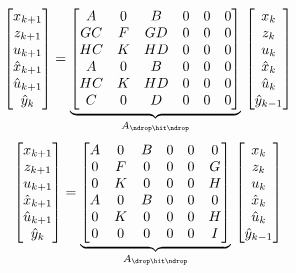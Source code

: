 \begin{equation}
    \begin{bmatrix}
        x_{k+1} \\
        z_{k+1} \\
        u_{k+1} \\
        \hat x_{k+1} \\
        \hat u_{k+1} \\
        \hat y_{k} \\
    \end{bmatrix} = \underbrace{\begin{bmatrix}
        A  & 0 & B & 0 & 0 & 0 \\
        GC & F & GD & 0 & 0 & 0 \\
        HC & K & HD & 0 & 0 & 0 \\
        A  & 0 & B & 0 & 0 & 0 \\
        HC & K & HD & 0 & 0 & 0 \\
        C & 0 & D & 0 & 0 & 0 \\
    \end{bmatrix}}_{A_{\ndrop\hit\ndrop}}\, \begin{bmatrix}
        x_{k} \\
        z_{k} \\
        u_{k} \\
        \hat x_{k} \\
        \hat u_{k} \\
        \hat y_{k-1} \\
    \end{bmatrix}
\end{equation}
%
\begin{equation}
    \begin{bmatrix}
        x_{k+1} \\
        z_{k+1} \\
        u_{k+1} \\
        \hat x_{k+1} \\
        \hat u_{k+1} \\
        \hat y_{k} \\
    \end{bmatrix} = \underbrace{\begin{bmatrix}
        A & 0 & B & 0 & 0 & 0 \\
        0 & F & 0 & 0 & 0 & G \\
        0 & K & 0 & 0 & 0 & H \\
        A & 0 & B & 0 & 0 & 0 \\
        0 & K & 0 & 0 & 0 & H \\
        0 & 0 & 0 & 0 & 0 & I
    \end{bmatrix}}_{A_{\drop\hit\ndrop}}\, \begin{bmatrix}
        x_{k} \\
        z_{k} \\
        u_{k} \\
        \hat x_{k} \\
        \hat u_{k} \\
        \hat y_{k-1} \\
    \end{bmatrix}
\end{equation}
